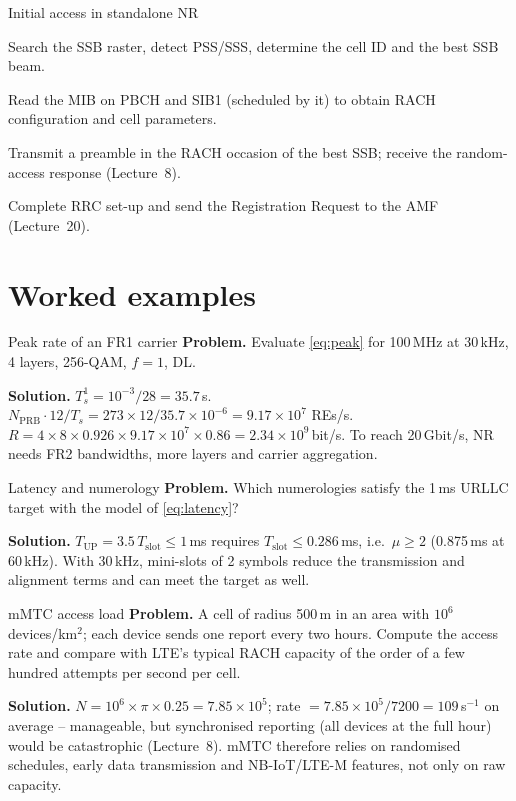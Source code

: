 \documentclass[11pt,a4paper]{article}
\begin{document}
\begin{procedurebox}{Initial access in standalone NR}\label{proc:access}
\begin{steps}
  \item Search the SSB raster, detect PSS/SSS, determine the cell ID and the best SSB beam.
  \item Read the MIB on PBCH and SIB1 (scheduled by it) to obtain RACH configuration and cell parameters.
  \item Transmit a preamble in the RACH occasion of the best SSB; receive the random-access response (Lecture~8).
  \item Complete RRC set-up and send the Registration Request to the AMF (Lecture~20).
\end{steps}
\end{procedurebox}

\section{Worked examples}

\begin{examplebox}{Peak rate of an FR1 carrier}\label{ex:peak}
\textbf{Problem.} Evaluate \cref{eq:peak} for 100\,MHz at 30\,kHz, 4 layers, 256-QAM, $f = 1$, DL.

\textbf{Solution.} $T_s^{1} = 10^{-3}/28 = 35.7$\,\textmu s. $N_{\mathrm{PRB}}\cdot12/T_s = 273\times12/35.7\times10^{-6} = 9.17\times10^{7}$
REs/s. $R = 4\times8\times0.926\times9.17\times10^{7}\times0.86 = 2.34\times10^{9}$\,bit/s. To reach 20\,Gbit/s, NR needs
FR2 bandwidths, more layers and carrier aggregation.
\end{examplebox}

\begin{examplebox}{Latency and numerology}\label{ex:lat}
\textbf{Problem.} Which numerologies satisfy the 1\,ms URLLC target with the model of \cref{eq:latency}?

\textbf{Solution.} $T_{\mathrm{UP}} = 3.5\,T_{\mathrm{slot}} \le 1$\,ms requires $T_{\mathrm{slot}} \le 0.286$\,ms, i.e.\
$\mu \ge 2$ (0.875\,ms at 60\,kHz). With 30\,kHz, mini-slots of 2 symbols reduce the transmission and alignment terms and can meet
the target as well.
\end{examplebox}

\begin{examplebox}{mMTC access load}\label{ex:density}
\textbf{Problem.} A cell of radius 500\,m in an area with $10^6$ devices/km$^2$; each device sends one report every two
hours. Compute the access rate and compare with LTE's typical RACH capacity of the order of a few hundred
attempts per second per cell.

\textbf{Solution.} $N = 10^6\times\pi\times0.25 = 7.85\times10^5$; rate $= 7.85\times10^5/7200 = 109$\,s$^{-1}$ on average --
manageable, but synchronised reporting (all devices at the full hour) would be catastrophic (Lecture~8). mMTC
therefore relies on randomised schedules, early data transmission and NB-IoT/LTE-M features, not only on raw
capacity.
\end{examplebox}
\end{document}
